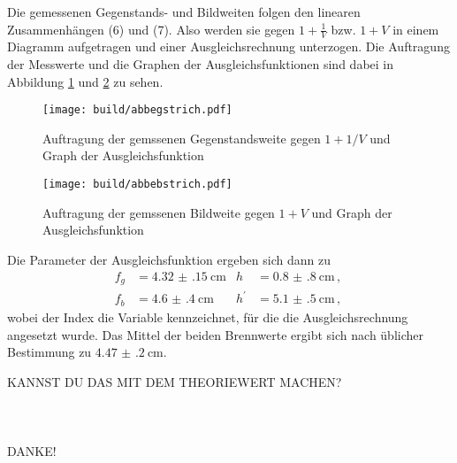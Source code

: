 Die gemessenen Gegenstands- und Bildweiten folgen den linearen Zusammenhängen
(6) und (7). Also werden sie gegen $1+\frac{1}{V}$ bzw. $1+V$ in einem Diagramm
aufgetragen und einer Ausgleichsrechnung unterzogen. Die Auftragung der Messwerte
und die Graphen der Ausgleichsfunktionen sind dabei in Abbildung \ref{fig:gstrich}
und \ref{fig:bstrich} zu sehen.

\begin{figure}%
  \centering
  \texttt{[image: build/abbegstrich.pdf]}
  \caption{Auftragung der gemssenen Gegenstandsweite gegen $1+1/V$ und Graph der Ausgleichsfunktion}
  \label{fig:gstrich}
\end{figure}

\begin{figure}%
  \centering
  \texttt{[image: build/abbebstrich.pdf]}
  \caption{Auftragung der gemssenen Bildweite gegen $1+V$ und Graph der Ausgleichsfunktion}
  \label{fig:bstrich}
\end{figure}

Die Parameter der Ausgleichsfunktion ergeben sich dann zu
\begin{align*}
	f_g &= \SI{4.32(15)}{\centi\meter}		&		h &= \SI{0.8(8)}{\centi\meter}\,,\ \\
	f_b &= \SI{4.6(4)}{\centi\meter}		&		h^\prime &= \SI{5.1(5)}{\centi\meter}\,,
\end{align*}
wobei der Index die Variable kennzeichnet, für die die Ausgleichsrechnung
angesetzt wurde. Das Mittel der beiden Brennwerte ergibt sich nach üblicher
Bestimmung zu $\SI{4.47(20)}{\centi\meter}$.

KANNST DU DAS MIT DEM THEORIEWERT MACHEN?
\\
\\
\\
\\
DANKE!
